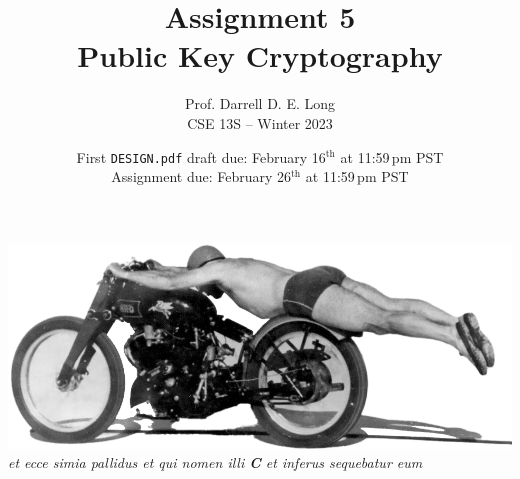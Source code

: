 \documentclass[11pt]{article}
\title{Assignment 5 \\ Public Key Cryptography}
\author{
  Prof.\xspace Darrell D.\xspace E.\xspace Long \\
  CSE 13S -- Winter 2023
}
\date{
  First \texttt{DESIGN.pdf} draft due: February 16$^\text{th}$ at 11:59\,pm PST \\
  Assignment due: February 26$^\text{th}$ at 11:59\,pm PST
}
\begin{document}
\maketitle






\label{numthm}








\vfill{}
\begin{center}
  \includegraphics[width=0.35\linewidth]{../../images/zoom-bike.png} \\
  \emph{et ecce simia pallidus et qui nomen illi \textbf{\textit{C}}  et inferus sequebatur eum}
\end{center}
\end{document}

